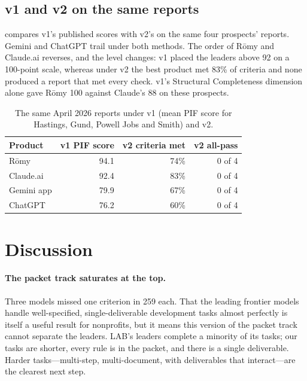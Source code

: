 \documentclass[11pt,a4paper]{article}
\newcommand{\romy}{R\={o}my}
\begin{document}
\subsection{v1 and v2 on the same reports}

 compares v1's published scores with v2's on the same four prospects' reports. Gemini and ChatGPT trail under both methods. The order of \romy{} and Claude.ai reverses, and the level changes: v1 placed the leaders above 92 on a 100-point scale, whereas under v2 the best product met 83\% of criteria and none produced a report that met every check. v1's Structural Completeness dimension alone gave \romy{} 100 against Claude's 88 on these prospects.

\begin{table}[h]
\centering
\small
\caption{The same April 2026 reports under v1 (mean PIF score for Hastings, Gund, Powell Jobs and Smith) and v2.}
\label{tab:v1v2}
\begin{tabular}{@{}lrrr@{}}
\toprule
\textbf{Product} & \textbf{v1 PIF score} & \textbf{v2 criteria met} & \textbf{v2 all-pass} \\
\midrule
\romy & 94.1 & 74\% & 0 of 4 \\
Claude.ai & 92.4 & 83\% & 0 of 4 \\
Gemini app & 79.9 & 67\% & 0 of 4 \\
ChatGPT & 76.2 & 60\% & 0 of 4 \\
\bottomrule
\end{tabular}
\end{table}

\section{Discussion}
\label{sec:discussion}

\paragraph{The packet track saturates at the top.} Three models missed one criterion in 259 each. That the leading frontier models handle well-specified, single-deliverable development tasks almost perfectly is itself a useful result for nonprofits, but it means this version of the packet track cannot separate the leaders. LAB's leaders complete a minority of its tasks; our tasks are shorter, every rule is in the packet, and there is a single deliverable. Harder tasks---multi-step, multi-document, with deliverables that interact---are the clearest next step.
\end{document}
